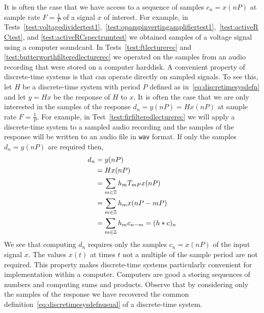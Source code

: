 It is often the case that we have access to a sequence of samples $c_n = x(nP)$ at sample rate $F = \tfrac{1}{P}$ of a signal $x$ of interest.  For example, in Tests~\ref{test:voltagedividertest1},~\ref{test:opampinvertingamplifiertest1},~\ref{test:activeRCtest}, and \ref{test:activeRCspectrumtest} we obtained samples of a voltage signal using a computer soundcard.  In Tests~\ref{test:ftlecturerec} and \ref{test:butterworthfilteredlecturerec} we operated on the samples from an audio recording that were stored on a computer harddisk.  %
A convenient property of discrete-time systems is that can operate directly on sampled signals.  To see this, let $H$ be a discrete-time system with period $P$ defined as in~\eqref{eq:discretimesysdefn} and let $y = Hx$ be the response of $H$ to $x$.  It is often the case that we are only interested in the samples of the response $d_n = y(nP) = Hx(nP)$ at sample rate $F = \tfrac{1}{P}$.  For example, in Test~\ref{test:firfilteredlecturerec} we will apply a discrete-time system to a sampled audio recording and the samples of the response will be written to an audio file in \texttt{wav} format.  If only the samples $d_n = y(nP)$ are required then,
\begin{align}
d_n &= y(nP) \nonumber \\
&= Hx(nP) \nonumber  \\
&= \sum_{m \in {\mathbb Z}} h_m T_{mP}x(nP) \nonumber \\
&= \sum_{m \in {\mathbb Z}} h_m x(nP - mP) \nonumber \\
&= \sum_{m \in {\mathbb Z}} h_m c_{n-m} = (h * c)_n \label{eq:disctimesyssamplesonly}
\end{align}
We see that computing $d_n$ requires only the samples $c_n = x(nP)$ of the input signal $x$.  The values $x(t)$ at times $t$ not a multiple of the sample period are not required.  This property makes discrete-time systems particularly convenient for implementation within a computer.  Computers are good a storing sequences of numbers and computing sums and products.  Observe that by considering only the samples of the response we have recovered the common definition~\eqref{eq:discretimesysdefnusual} of a discrete-time system.



